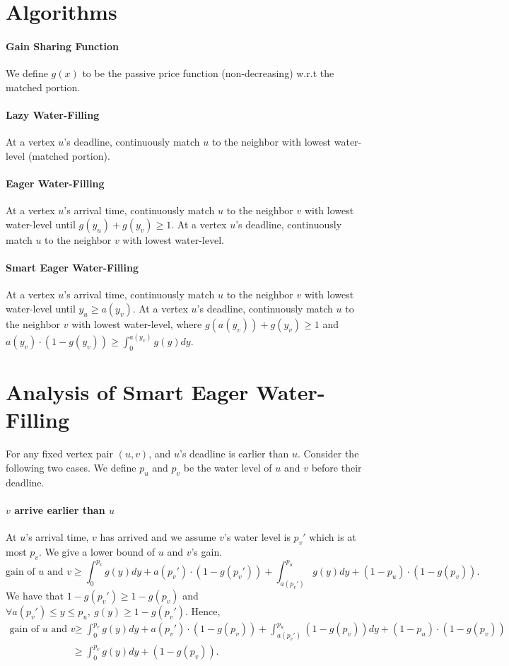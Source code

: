 \section{Algorithms}
\paragraph{Gain Sharing Function}
We define $g(x)$ to be the passive price function (non-decreasing) w.r.t the matched portion. 
\paragraph{Lazy Water-Filling} At a vertex $u$'s deadline, continuously match $u$ to the neighbor with lowest water-level (matched portion). 
\paragraph{Eager Water-Filling} At a vertex $u$'s arrival time, continuously match $u$ to the neighbor $v$ with lowest water-level until $g(y_u) + g(y_v) \geq 1$. At a vertex $u$'s deadline, continuously match $u$ to the neighbor $v$ with lowest water-level.
\paragraph{Smart Eager Water-Filling} At a vertex $u$'s arrival time, continuously match $u$ to the neighbor $v$ with lowest water-level until $y_u \geq a(y_v)$. At a vertex $u$'s deadline, continuously match $u$ to the neighbor $v$ with lowest water-level, where $g(a(y_v)) + g(y_v) \geq 1$ and $a(y_v)\cdot (1-g(y_v)) \geq \int_0^{a(y_v)} g(y)dy$. 

\section{Analysis of Smart Eager Water-Filling}
For any fixed vertex pair $(u,v)$, and $u$'s deadline is earlier than $u$. Consider the following two cases. We define $p_u$ and $p_v$ be the water level of $u$ and $v$ before their deadline.
\paragraph{$v$ arrive earlier than $u$}
At $u$'s arrival time, $v$ has arrived and we assume $v$'s water level is $p_v'$ which is at most $p_v$. We give a lower bound of $u$ and $v$'s gain.
$$
\text{gain of $u$ and $v$} \geq \int_0^{p_v} g(y) dy + a(p_v')\cdot (1-g(p_v')) + \int_{a(p_v')}^{p_u} g(y) dy + (1-p_u)\cdot(1-g(p_v)). 
$$
We have that $1-g(p_v') \geq 1 - g(p_v)$ and $\forall a(p_v')\leq y \leq p_u,~ g(y) \geq 1-g(p_v')$. Hence, 
\begin{align*}
    \text{gain of $u$ and $v$} 
    &\geq \int_0^{p_v} g(y) dy + a(p_v')\cdot (1-g(p_v)) + \int_{a(p_v')}^{p_u} (1-g(p_v)) dy + (1-p_u)\cdot(1-g(p_v)) \\
    &\geq \int_0^{p_v} g(y) dy + (1-g(p_v)).
\end{align*}

